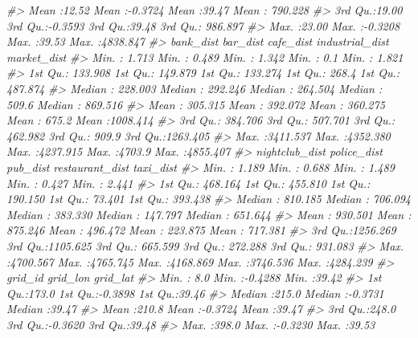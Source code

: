 \documentclass[
]{book}
\newenvironment{Shaded}{\begin{snugshade}}{\end{snugshade}}
\newcommand{\CommentTok}[1]{\textcolor[rgb]{0.56,0.35,0.01}{\textit{#1}}}
\begin{document}
\begin{Shaded}
\begin{Highlighting}[]
\CommentTok{\#\textgreater{}                     Mean   :12.52   Mean   :{-}0.3724   Mean   :39.47   Mean   : 790.228  }
\CommentTok{\#\textgreater{}                     3rd Qu.:19.00   3rd Qu.:{-}0.3593   3rd Qu.:39.48   3rd Qu.: 986.897  }
\CommentTok{\#\textgreater{}                     Max.   :23.00   Max.   :{-}0.3208   Max.   :39.53   Max.   :4838.847  }
\CommentTok{\#\textgreater{}    bank\_dist           bar\_dist          cafe\_dist        industrial\_dist   market\_dist      }
\CommentTok{\#\textgreater{}  Min.   :   1.713   Min.   :   0.489   Min.   :   1.342   Min.   :   0.1   Min.   :   1.821  }
\CommentTok{\#\textgreater{}  1st Qu.: 133.908   1st Qu.: 149.879   1st Qu.: 133.274   1st Qu.: 268.4   1st Qu.: 487.874  }
\CommentTok{\#\textgreater{}  Median : 228.003   Median : 292.246   Median : 264.504   Median : 509.6   Median : 869.516  }
\CommentTok{\#\textgreater{}  Mean   : 305.315   Mean   : 392.072   Mean   : 360.275   Mean   : 675.2   Mean   :1008.414  }
\CommentTok{\#\textgreater{}  3rd Qu.: 384.706   3rd Qu.: 507.701   3rd Qu.: 462.982   3rd Qu.: 909.9   3rd Qu.:1263.405  }
\CommentTok{\#\textgreater{}  Max.   :3411.537   Max.   :4352.380   Max.   :4237.915   Max.   :4703.9   Max.   :4855.407  }
\CommentTok{\#\textgreater{}  nightclub\_dist      police\_dist          pub\_dist        restaurant\_dist      taxi\_dist       }
\CommentTok{\#\textgreater{}  Min.   :   1.189   Min.   :   0.688   Min.   :   1.489   Min.   :   0.427   Min.   :   2.441  }
\CommentTok{\#\textgreater{}  1st Qu.: 468.164   1st Qu.: 455.810   1st Qu.: 190.150   1st Qu.:  73.401   1st Qu.: 393.438  }
\CommentTok{\#\textgreater{}  Median : 810.185   Median : 706.094   Median : 383.330   Median : 147.797   Median : 651.644  }
\CommentTok{\#\textgreater{}  Mean   : 930.501   Mean   : 875.246   Mean   : 496.472   Mean   : 223.875   Mean   : 717.381  }
\CommentTok{\#\textgreater{}  3rd Qu.:1256.269   3rd Qu.:1105.625   3rd Qu.: 665.599   3rd Qu.: 272.288   3rd Qu.: 931.083  }
\CommentTok{\#\textgreater{}  Max.   :4700.567   Max.   :4765.745   Max.   :4168.869   Max.   :3746.536   Max.   :4284.239  }
\CommentTok{\#\textgreater{}     grid\_id         grid\_lon          grid\_lat    }
\CommentTok{\#\textgreater{}  Min.   :  8.0   Min.   :{-}0.4288   Min.   :39.42  }
\CommentTok{\#\textgreater{}  1st Qu.:173.0   1st Qu.:{-}0.3898   1st Qu.:39.46  }
\CommentTok{\#\textgreater{}  Median :215.0   Median :{-}0.3731   Median :39.47  }
\CommentTok{\#\textgreater{}  Mean   :210.8   Mean   :{-}0.3724   Mean   :39.47  }
\CommentTok{\#\textgreater{}  3rd Qu.:248.0   3rd Qu.:{-}0.3620   3rd Qu.:39.48  }
\CommentTok{\#\textgreater{}  Max.   :398.0   Max.   :{-}0.3230   Max.   :39.53}
\end{Highlighting}
\end{Shaded}
\end{document}
